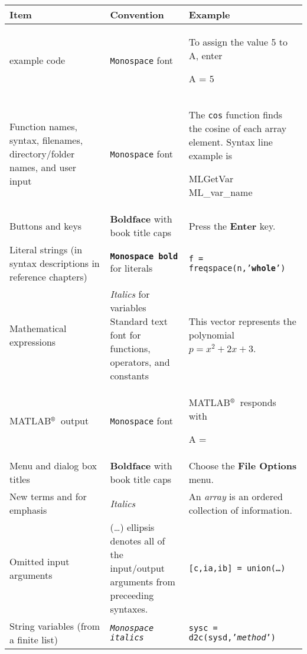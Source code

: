 \documentclass[a4paper]{refrep}
\newcommand{\matlab}{\textsf{MATLAB$^{\mbox{\scriptsize\textregistered}}$}}
\begin{document}
\maxipagerulefalse
\begin{maxipage}

\begin{tabular*}{\textwidth}{p{}@{\extracolsep{\fill}}p{}p{}}
\hline
\textsf{\textbf{Item}}
&
\textsf{\textbf{Convention}}
&
\textsf{\textbf{Example}}
\\
\hline
example code 
&
\texttt{Monospace} font
&
To assign the value 5 to A, enter
\begin{example}
A = 5 
\end{example}
\\[-2\parsep]
Function names, syntax, filenames, directory/folder names, and user input
&
\texttt{Monospace} font
&
The \texttt{cos} function finds the cosine of each array element.
\linebreak
Syntax line example is
\begin{example}
MLGetVar ML\_var\_name 
\end{example}
\\[-2\parsep]
Buttons and keys
&
\textbf{Boldface} with book title caps
&
Press the \textbf{Enter} key.
\\
Literal strings (in syntax descriptions in reference chapters)
&
\textbf{\texttt{Monospace bold}} for literals
&
\texttt{f = freqspace(n,'\textbf{whole}')}
\\
Mathematical expressions
&
\textit{Italics} for variables
\linebreak
Standard text font for functions, operators, and constants
&
This vector represents the polynomial $p = x^2 + 2x + 3$.
\\
\matlab\ output
&
\texttt{Monospace} font
&
\matlab\ responds with
\begin{example}
A = \linebreak
\quad 5
\end{example}
\\[-2\parsep]
Menu and dialog box titles
&
\textbf{Boldface} with book title caps
&
Choose the \textbf{File Options} menu.
\\
New terms and for emphasis
&
\emph{Italics}
&
An \emph{array} is an ordered collection of information.
\\
Omitted input arguments
&
(\ldots) ellipsis denotes all of the input/output arguments from preceeding syntaxes.
&
\texttt{[c,ia,ib] = union(\ldots)}
\\
String variables (from a finite list)
&
\texttt{\textsl{Monospace italics}}
&
\texttt{sysc = d2c(sysd,'\textsl{method}')}
\\
\hline
\end{tabular*}

\end{maxipage}
\maxipageruletrue
\end{document}
